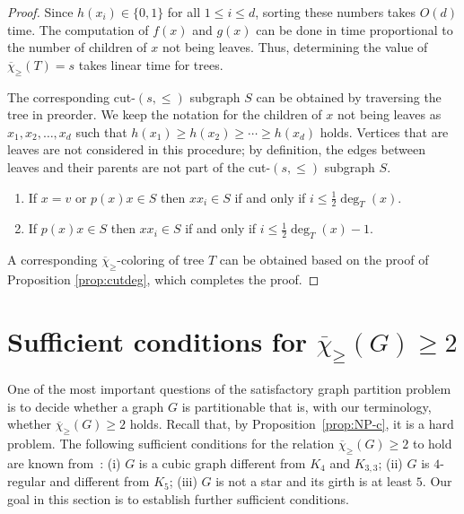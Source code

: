 \documentclass{article}
\theoremstyle{definition}
\newcommand{\mc}{\overline{\chi}_{\geqslant}}
\begin{document}
\begin{proof}
Since $h(x_i) \in \{0, 1\}$ for all $1 \leq i \leq d$, sorting these numbers takes $O(d)$ time. The computation of $f(x)$ and $g(x)$ can be done in time proportional to the number of children of $x$ not being leaves.  Thus, determining the value of $\mc(T) = s$ takes linear time for trees.

The corresponding cut-$(s,\leqslant)$ subgraph $S$ can be obtained by traversing the tree in preorder. We keep the notation for the children of $x$ not being leaves as $x_1,x_2,\ldots,x_d$ such that $h(x_1) \geq  h(x_2) \geq \cdots
\geq h(x_d)$ holds. Vertices that are leaves are not considered in this procedure; by definition, the edges between leaves and their parents are not part of the cut-$(s,\leqslant)$ subgraph $S$.
\begin{enumerate}
    \item If $x=v$ or $p(x)x \in S$ then $xx_i \in S$ if and only if $i \leq \frac{1}{2}\deg_T(x)$.
    \item If $p(x)x \in S$ then $xx_i \in S$ if and only if $i \leq \frac{1}{2}\deg_T(x)-1$.
\end{enumerate}

A corresponding $\mc$-coloring of tree $T$ can be obtained based on the proof of Proposition \ref{prop:cutdeg}, which completes the proof.
\end{proof}

\section{Sufficient conditions for $\mc(G)\ge 2$}  \label{sec:sufficient}

One of the most important questions of the satisfactory graph partition problem is to decide whether a graph $G$ is partitionable that is, with our terminology, whether $\mc(G) \ge 2$ holds. Recall that, by Proposition~\ref{prop:NP-c}, it is a hard problem. %
The following sufficient conditions for the relation $\mc(G) \ge 2$ to hold are known from~\cite{BTV-2003, GeKob-2004, Moshi, Shaf}: (i) $G$ is a cubic graph different from $K_4$ and $K_{3,3}$; (ii) $G$ is $4$-regular and different from $K_5$; (iii)  $G$ is not a star and its girth is at least $5$.
Our goal in this section is to establish further sufficient conditions. 
\end{document}
